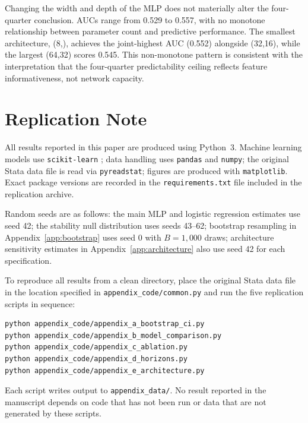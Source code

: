 \documentclass[12pt]{article}
\begin{document}
Changing the width and depth of the MLP does not materially alter the
four-quarter conclusion.  AUCs range from 0.529 to 0.557, with no monotone
relationship between parameter count and predictive performance.  The smallest
architecture, (8,), achieves the joint-highest AUC (0.552) alongside (32,16),
while the largest (64,32) scores 0.545.  This non-monotone pattern is
consistent with the interpretation that the four-quarter predictability ceiling
reflects feature informativeness, not network capacity.

\section{Replication Note}\label{app:replication}

All results reported in this paper are produced using Python~3.  Machine
learning models use \texttt{scikit-learn} \citep{pedregosa2011}; data
handling uses \texttt{pandas} and \texttt{numpy}; the original Stata data
file is read via \texttt{pyreadstat}; figures are produced with
\texttt{matplotlib}.  Exact package versions are recorded in the
\texttt{requirements.txt} file included in the replication archive.

Random seeds are as follows: the main MLP and logistic regression estimates
use seed 42; the stability null distribution uses seeds 43--62; bootstrap
resampling in Appendix~\ref{app:bootstrap} uses seed 0 with $B=1{,}000$
draws; architecture sensitivity estimates in Appendix~\ref{app:architecture}
also use seed 42 for each specification.

To reproduce all results from a clean directory, place the original Stata
data file in the location specified in \texttt{appendix\_code/common.py}
and run the five replication scripts in sequence:

\begin{verbatim}
python appendix_code/appendix_a_bootstrap_ci.py
python appendix_code/appendix_b_model_comparison.py
python appendix_code/appendix_c_ablation.py
python appendix_code/appendix_d_horizons.py
python appendix_code/appendix_e_architecture.py
\end{verbatim}

Each script writes output to \texttt{appendix\_data/}.  No result reported
in the manuscript depends on code that has not been run or data that are not
generated by these scripts.
\end{document}
